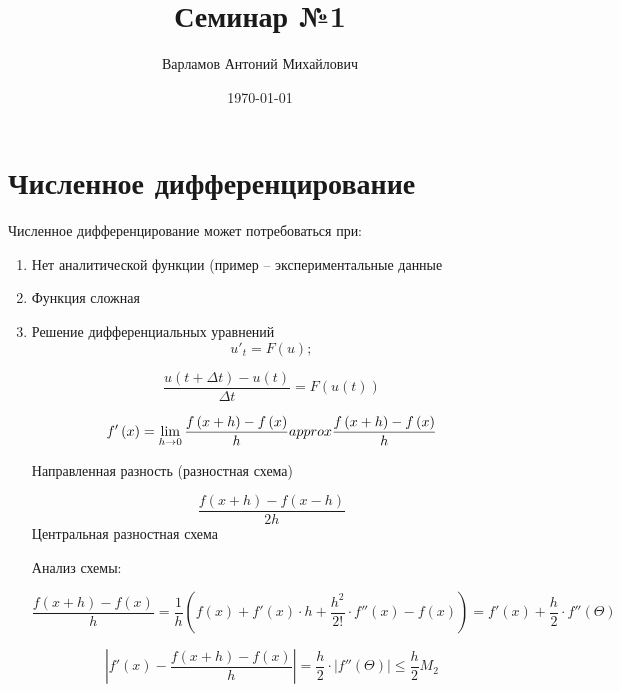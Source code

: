 \documentclass[10pt,a4paper]{article}
\title{Семинар №1}
\date{\today}
\author{Варламов Антоний Михайлович}
\begin{document}
	\maketitle
	\tableofcontents

	\section{Численное дифференцирование}
	
		Численное дифференцирование может потребоваться при:
		\begin{enumerate}
			\item Нет аналитической функции (пример -- экспериментальные данные
			\item Функция сложная
			\item Решение дифференциальных уравнений
			\begin{equation}
				u'_{t} = F\left(u\right);
			\end{equation}
			
			\begin{equation}
				\frac{u\left(t + \Delta t\right) - u\left(t\right)}{\Delta t} = F\left(u\left(t\right)\right)
			\end{equation}
			
			\begin{equation}
				f'\left(x\right) = \lim\limits_{h \rightarrow 0}\frac{f\left(x + h\right) - f\left(x\right)}{h} \\approx \frac{f\left(x + h\right) - f\left(x\right)}{h}
			\end{equation}
			
			Направленная разность (разностная схема)
			
			\begin{equation}
				\frac{f\left(x + h\right) - f\left(x - h\right)}{2h}	
			\end{equation}						
			Центральная разностная схема
			
			Анализ схемы:
			
			\begin{equation}
				\frac{f\left(x + h\right) - f\left(x\right)}{h} = \frac{1}{h}\left(f\left(x\right) + f'\left(x\right)\cdot h + \frac{h^2}{2!}\cdot f''\left(x\right) - f\left(x\right)\right) = f'\left(x\right) + \frac{h}{2}\cdot f''\left(\Theta\right)
			\end{equation}
			
			\begin{equation}
				\left|f'\left(x\right) - \frac{f\left(x + h\right) - f\left(x\right)}{h}\right| = \frac{h}{2}\cdot\left|f''\left(\Theta\right)\right| \leq \frac{h}{2}M_{2}
			\end{equation}
			

\end{enumerate}
\end{document}
